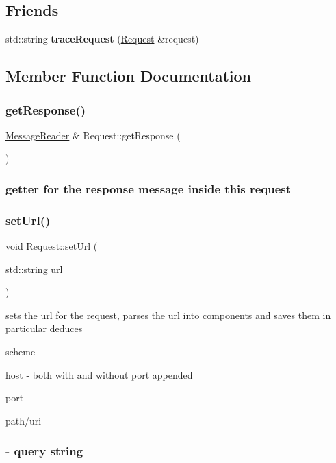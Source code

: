 \subsection*{Friends}
\begin{DoxyCompactItemize}
\item 
\mbox{\label{class_request_aafeb39491c604dd3ba954b382d31f56f}} 
std\+::string {\bfseries trace\+Request} (\hyperlink{class_request}{Request} \&request)
\end{DoxyCompactItemize}


\subsection{Member Function Documentation}
\mbox{\label{class_request_ac9e91894d06fac3bcb657ba64693da22}} 
\subsubsection{\texorpdfstring{get\+Response()}{getResponse()}}
{\footnotesize\ttfamily \hyperlink{class_message_reader}{Message\+Reader} \& Request\+::get\+Response (\begin{DoxyParamCaption}{ }\end{DoxyParamCaption})}



 \subsubsection*{getter for the response message inside this request }\mbox{\label{class_request_a0a0cc1ae66771dd92c1ad78e9e6df59a}} 
\subsubsection{\texorpdfstring{set\+Url()}{setUrl()}}
{\footnotesize\ttfamily void Request\+::set\+Url (\begin{DoxyParamCaption}\item[{std\+::string}]{url }\end{DoxyParamCaption})}



 sets the url for the request, parses the url into components and saves them in particular deduces
\begin{DoxyItemize}
\item scheme
\item host -\/ both with and without port appended
\item port
\item path/uri \subsubsection*{-\/ query string }
\end{DoxyItemize}

